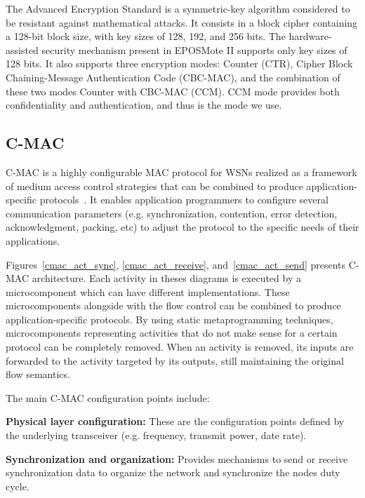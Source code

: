 The Advanced Encryption Standard is a symmetric-key algorithm considered to be resistant against mathematical attacks. 
It consists in a block cipher containing a 128-bit block size, with key sizes of 128, 192, and 256 bits.
The hardware-assisted security mechanism present in EPOSMote II supports only key sizes of 128 bits.
It also supports three encryption modes: Counter (CTR), Cipher Block Chaining-Message Authentication Code (CBC-MAC), and the combination of these two modes Counter with CBC-MAC (CCM).
CCM mode provides both confidentiality and authentication, and thus is the mode we use.

\subsection{C-MAC}
C-MAC is a highly configurable MAC protocol for WSNs realized as a framework of
medium access control strategies that can be combined to produce
application-specific protocols~\cite{steiner:2010}. It enables application
programmers to configure several communication parameters (e.g.  synchronization,
contention, error detection, acknowledgment, packing, etc) to adjust the protocol
to the specific needs of their applications. 

Figures~\ref{cmac_act_sync}, \ref{cmac_act_receive}, and~\ref{cmac_act_send} presents C-MAC architecture. 
Each activity in theses diagrams is executed by a microcomponent which can have different implementations.
These microcomponents alongside with the flow control can be combined to produce application-specific protocols.
By using static metaprogramming techniques, microcomponents representing activities that do not make sense for a certain protocol can be completely removed.
When an activity is removed, its inputs are forwarded to the activity targeted by its outputs, still maintaining the original flow semantics.


The main C-MAC configuration points include:

\textbf{Physical layer configuration:} These are the configuration points defined
by the underlying transceiver (e.g. frequency, transmit power, date rate).

\textbf{Synchronization and organization:} Provides mechanisms to send or receive
synchronization data to organize the network and synchronize the nodes duty
cycle.


